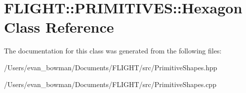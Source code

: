 \hypertarget{class_f_l_i_g_h_t_1_1_p_r_i_m_i_t_i_v_e_s_1_1_hexagon}{}\section{F\+L\+I\+G\+HT\+:\+:P\+R\+I\+M\+I\+T\+I\+V\+ES\+:\+:Hexagon Class Reference}
\label{class_f_l_i_g_h_t_1_1_p_r_i_m_i_t_i_v_e_s_1_1_hexagon}


The documentation for this class was generated from the following files\+:\begin{DoxyCompactItemize}
\item 
/\+Users/evan\+\_\+bowman/\+Documents/\+F\+L\+I\+G\+H\+T/src/Primitive\+Shapes.\+hpp\item 
/\+Users/evan\+\_\+bowman/\+Documents/\+F\+L\+I\+G\+H\+T/src/Primitive\+Shapes.\+cpp\end{DoxyCompactItemize}
